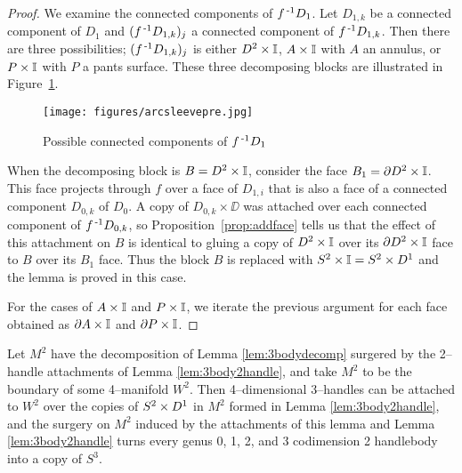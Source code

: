 \begin{proof}
	We examine the connected components of $f^{\,\text{-}1} D_1$.
	Let $D_{1,k}$ be a connected component of $D_1$ and $(f^{\,\text{-}1} D_{1,k})_j$ a connected component of $f^{\,\text{-}1} D_{1,k}$.
	Then there are three possibilities; $(f^{\,\text{-}1} D_{1,k})_j$ is either $D^2\times\mathbb{I}$, $A\times\mathbb{I}$ with $A$ an annulus, or $P\times\mathbb{I}$ with $P$ a pants surface.
	These three decomposing blocks are illustrated in Figure~\ref{fig:arcsleevepre}.
	
	\begin{figure}
		\centering
		\captionsetup{justification=centering}
		\caption{Possible connected components of  $f^{\,\text{-}1} D_1$}
		\texttt{[image: figures/arcsleevepre.jpg]}
		\label{fig:arcsleevepre}
	\end{figure}
	
	When the decomposing block is $B=D^2\times\mathbb{I}$, consider the face $B_1=\partial D^2\times \mathbb{I}$.
	This face projects through $f$ over a face of $D_{1,i}$ that is also a face of a connected component $D_{0,k}$ of $D_0$.
	A copy of $D_{0,k}\times\DD$ was attached over each connected component of $f^{\,\text{-}1} D_{0,k}$, so Proposition~\ref{prop:addface} tells us that the effect of this attachment on $B$ is identical to gluing a copy of $D^2\times \mathbb{I}$ over its $\partial D^2\times \mathbb{I}$ face to $B$ over its $B_1$ face.
	Thus the block $B$ is replaced with $S^2\times\mathbb{I}=S^2\times D^1$ and the lemma is proved in this case.
	
	For the cases of $A\times\mathbb{I}$ and $P\times\mathbb{I}$, we iterate the previous argument for each face obtained as $\partial A\times\mathbb{I}$ and $\partial P\times\mathbb{I}$.	
\end{proof}


















\begin{lem}
	\label{lem:3body3handle}
	Let $M^2$ have the decomposition of Lemma \ref{lem:3bodydecomp} surgered by the 2--handle attachments of Lemma \ref{lem:3body2handle}, and take $M^2$ to be the boundary of some 4--manifold $W^2$.
	Then 4--dimensional 3--handles can be attached to $W^2$ over the copies of $S^2\times D^1$ in $M^2$ formed in Lemma \ref{lem:3body2handle}, and the surgery on $M^2$ induced by the attachments of this lemma and Lemma \ref{lem:3body2handle} turns every genus 0, 1, 2, and 3 codimension 2 handlebody into a copy of $S^3$.
\end{lem}

